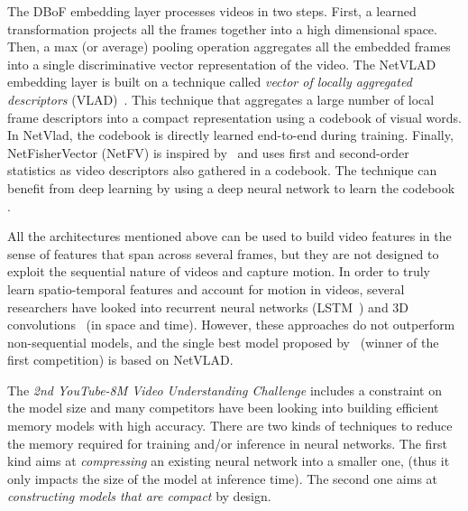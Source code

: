 The DBoF embedding layer processes videos in two steps.
First, a learned transformation projects all the frames together into a high dimensional space. 
Then, a max (or average) pooling operation aggregates all the embedded frames into a single discriminative vector representation of the video.
The NetVLAD embedding layer is built on a technique called \emph{vector of locally aggregated descriptors} (VLAD)~\cite{jegou2010aggregating}.
This technique that aggregates a large number of local frame descriptors into a compact representation using a codebook of visual words.
In NetVlad, the codebook is directly learned end-to-end during training.
Finally, NetFisherVector (NetFV) is inspired by~\citet{perronnin2007fisher} and uses first and second-order statistics as video descriptors also gathered in a codebook.
The technique can benefit from deep learning by using a deep neural network to learn the codebook \cite{miech2017learnable}.

All the architectures mentioned above can be used to build video features in the sense of features that span across several frames, but they are not designed to exploit the sequential nature of videos and capture motion.
In order to truly learn spatio-temporal features and account for motion in videos, several researchers have looked into recurrent neural networks (\eg LSTM~\cite{yue2015beyond,li2017temporal}) and 3D convolutions~\cite{karpathy2014large} (in space and time).
However, these approaches do not outperform non-sequential models, and the single best model proposed by~\citet{miech2017learnable} (winner of the first \yt competition) is based on NetVLAD. 

The \emph{2nd YouTube-8M Video Understanding Challenge} includes a constraint on the model size and many competitors have been looking into building efficient memory models with high accuracy.
There are two kinds of techniques to reduce the memory required for training and/or inference in neural networks.
The first kind aims at \emph{compressing} an existing neural network into a smaller one, (thus it only impacts the size of the model at inference time).
The second one aims at \emph{constructing models that are compact} by design. 



